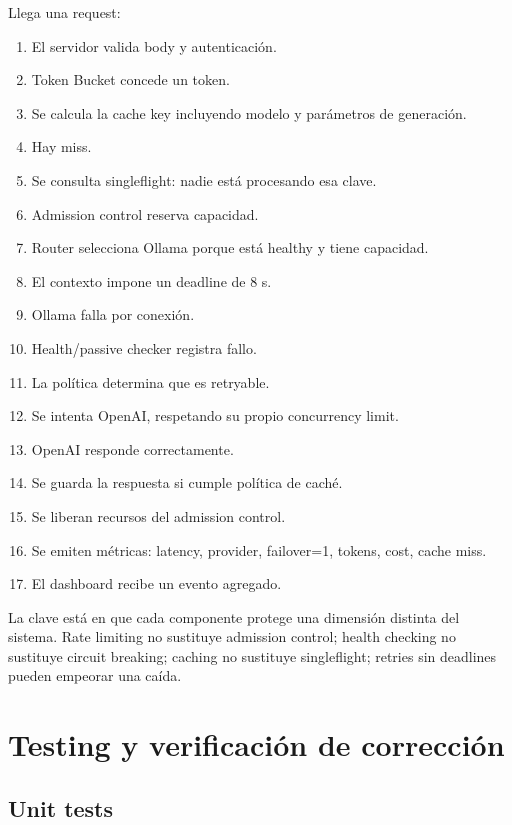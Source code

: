 \documentclass[11pt,a4paper]{article}
\begin{document}
Llega una request:

\begin{enumerate}
  \item El servidor valida body y autenticación.
  \item Token Bucket concede un token.
  \item Se calcula la cache key incluyendo modelo y parámetros de generación.
  \item Hay miss.
  \item Se consulta singleflight: nadie está procesando esa clave.
  \item Admission control reserva capacidad.
  \item Router selecciona Ollama porque está healthy y tiene capacidad.
  \item El contexto impone un deadline de 8 s.
  \item Ollama falla por conexión.
  \item Health/passive checker registra fallo.
  \item La política determina que es retryable.
  \item Se intenta OpenAI, respetando su propio concurrency limit.
  \item OpenAI responde correctamente.
  \item Se guarda la respuesta si cumple política de caché.
  \item Se liberan recursos del admission control.
  \item Se emiten métricas: latency, provider, failover=1, tokens, cost, cache miss.
  \item El dashboard recibe un evento agregado.
\end{enumerate}

La clave está en que cada componente protege una dimensión distinta del sistema. Rate limiting no sustituye admission control; health checking no sustituye circuit breaking; caching no sustituye singleflight; retries sin deadlines pueden empeorar una caída.

\section{Testing y verificación de corrección}

\subsection{Unit tests}
\end{document}
